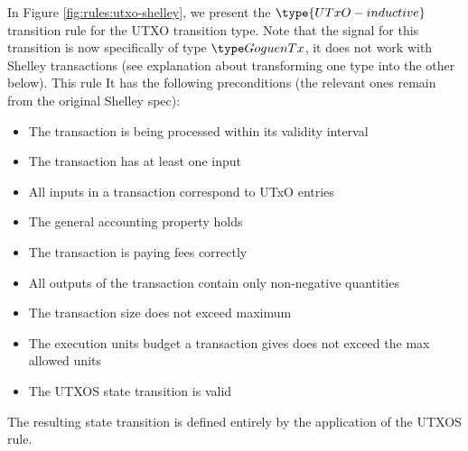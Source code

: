 In Figure \ref{fig:rules:utxo-shelley}, we present the $\type{UTxO-inductive}$
transition rule for the UTXO transition type. Note that the
signal for this transition is now specifically of type $\GoguenTx$, it does not
work with Shelley transactions (see explanation about transforming one type into
the other below). This rule
It has the following preconditions (the relevant ones remain
from the original Shelley spec):

\begin{itemize}
  \item The transaction is being processed within its validity interval

  \item The transaction has at least one input

  \item All inputs in a transaction correspond to UTxO entries

  \item The general accounting property holds

  \item The transaction is paying fees correctly

  \item All outputs of the transaction contain only non-negative quantities

  \item The transaction size does not exceed maximum

  \item The execution units budget a transaction gives does not exceed the max
  allowed units

  \item The UTXOS state transition is valid
\end{itemize}

The resulting state transition is defined entirely by the application of the
UTXOS rule.

